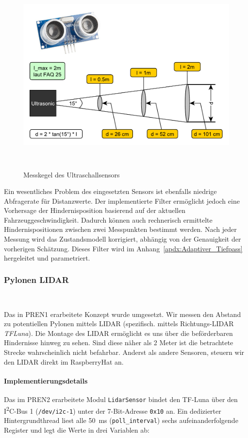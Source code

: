 \documentclass[main.tex]{subfiles} %
\begin{document}
\begin{figure}[H]
  \centering
  \includegraphics[width =
  0.5\linewidth]{./fig_Antriebsregelung_Firmware/Auslesegenauigkeit_Ultraschall.pdf}
  \caption{Messkegel des Ultraschallsensors}~\label{fig:HcSr04_Messkegel}
\end{figure}

Ein wesentliches Problem des eingesetzten Sensors ist ebenfalls niedrige
Abfragerate für Distanzwerte. Der implementierte Filter ermöglicht jedoch eine
Vorhersage der Hindernisposition basierend auf der aktuellen
Fahrzeuggeschwindigkeit. Dadurch können auch rechnerisch ermittelte
Hindernispositionen zwischen zwei Messpunkten bestimmt werden. Nach jeder
Messung wird das Zustandsmodell korrigiert, abhängig von der Genauigkeit der
vorherigen Schätzung. Dieses Filter wird im
Anhang~\ref{apdx:Adaptiver_Tiefpass} hergeleitet und parametriert.


\subsubsection*{Pylonen LIDAR}~\label{sec:Sensorik_Lidar}

Das in PREN1 erarbeitete Konzept wurde umgesetzt. Wir messen den
Abstand zu potentiellen Pylonen
mittels LIDAR (spezifisch. mittels Richtungs-LIDAR \textit{TFLuna}).
Die Montage des LIDAR ermöglicht es uns über die beförderbaren
Hindernisse hinweg zu sehen.
Sind diese näher als 2 Meter ist die betrachtete Strecke
wahrscheinlich nicht befahrbar.
Anderst als andere Sensoren, steuern wir den LIDAR direkt im RaspberryHat an.

\paragraph{Implementierungsdetails}
Das im PREN2 erarbeitete Modul \texttt{LidarSensor} bindet den TF-Luna über den
I\textsuperscript{2}C-Bus
1 (\texttt{/dev/i2c-1}) unter der 7-Bit-Adresse \texttt{0x10} an.
Ein dedizierter Hintergrundthread liest alle \SI{50}{ms}
(\texttt{poll\_interval}) sechs aufeinanderfolgende Register und legt
die Werte in drei Variablen ab:
\end{document}
